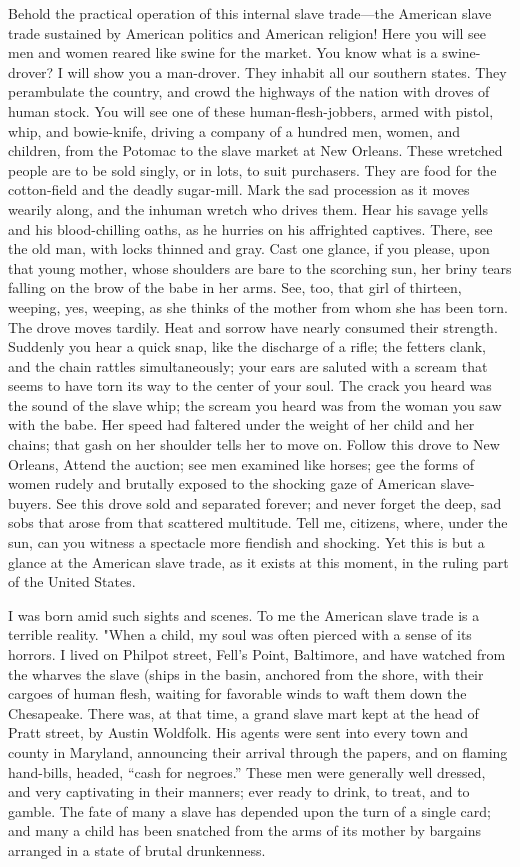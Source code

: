Behold the practical operation of this internal slave trade---the
American slave trade sustained by American politics and American
religion! Here you will see men and women reared like swine for the
market. You know what is a swine-drover? I will show you {}a man-drover.
They inhabit all our southern states. They perambulate the country, and
crowd the highways of the nation with droves of human stock. You will
see one of these human-flesh-jobbers, armed with pistol, whip, and
bowie-knife, driving a company of a hundred men, women, and children,
from the Potomac to the slave market at New Orleans. These wretched
people are to be sold singly, or in lots, to suit purchasers. They are
food for the cotton-field and the deadly sugar-mill. Mark the sad
procession as it moves wearily along, and the inhuman wretch who drives
them. Hear his savage yells and his blood-chilling oaths, as he hurries
on his affrighted captives. There, see the old man, with locks thinned
and gray. Cast one glance, if you please, upon that young mother, whose
shoulders are bare to the scorching sun, her briny tears falling on the
brow of the babe in her arms. See, too, that girl of thirteen, weeping,
yes, weeping, as she thinks of the mother from whom she has been torn.
The drove moves tardily. Heat and sorrow have nearly consumed their
strength. Suddenly you hear a quick snap, like the discharge of a rifle;
the fetters clank, and the chain rattles simultaneously; your ears are
saluted with a scream that seems to have torn its way to the center of
your soul. The crack you heard was the sound of the slave whip; the
scream you heard was from the woman you saw with the babe. Her speed had
faltered under the weight of her child and her chains; that gash on her
shoulder tells her to move on. Follow this drove to New Orleans, Attend
the auction; see men examined like horses; gee the forms of women rudely
and brutally exposed to the shocking gaze of American slave-buyers. See
this drove sold and separated forever; and never forget the deep, sad
sobs that arose from that scattered multitude. Tell me, citizens, where,
under the sun, can you witness a spectacle more fiendish and shocking.
Yet this is but a glance at the American slave trade, as it exists at
this moment, in the ruling part of the United States.

I was born amid such sights and scenes. To me the American slave trade
is a terrible reality. "When a child, my soul was often pierced with a
sense of its horrors. I lived on Philpot street, Fell's Point,
Baltimore, and have watched from the wharves the slave (ships in the
basin, anchored from the shore, with their cargoes of human flesh,
waiting for favorable winds to waft them down the Chesapeake. There was,
at that time, a grand slave mart kept at the head of Pratt street, by
Austin Woldfolk. His agents were {}sent into every town and county in
Maryland, announcing their arrival through the papers, and on flaming
hand-bills, headed, ``cash for negroes.'' These men were generally well
dressed, and very captivating in their manners; ever ready to drink, to
treat, and to gamble. The fate of many a slave has depended upon the
turn of a single card; and many a child has been snatched from the arms
of its mother by bargains arranged in a state of brutal drunkenness.

